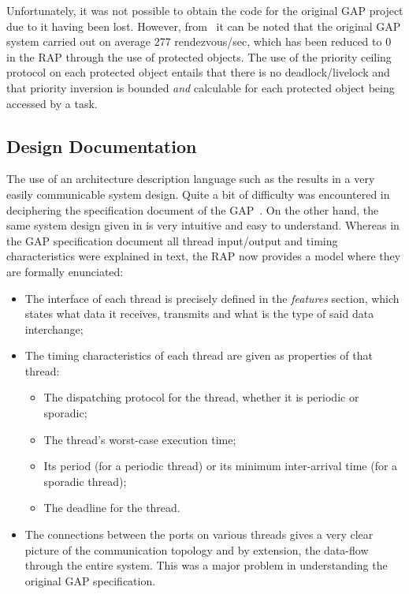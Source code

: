Unfortunately, it was not possible to obtain the code for the original
GAP project due to it having been lost. However,
from~\cite{locke@rtss91, locke@sei90} it can be noted that the
original GAP system carried out on average 277 rendezvous/sec, which
has been reduced to 0 in the RAP through the use of protected
objects. The use of the priority ceiling protocol on each protected
object entails that there is no deadlock/livelock and that priority
inversion is bounded \emph{and} calculable for each protected object
being accessed by a task.

\subsection{Design Documentation}
The use of an architecture description language such as the \aadl
results in a very easily communicable system design. Quite a bit of
difficulty was encountered in deciphering the specification document
of the GAP~\cite{locke@sei90}. On the other hand, the same system
design given in \aadl is very intuitive and easy to
understand. Whereas in the GAP specification document all thread
input/output and timing characteristics were explained in text, the
RAP now provides a model where they are formally enunciated:

\begin{itemize}
\item
  The interface of each thread is precisely defined in the
  \emph{features} section, which states what data it receives,
  transmits and what is the type of said data interchange;

\item
  The timing characteristics of each thread are given as \aadl
  properties of that thread:
  \begin{itemize}
  \item
    The dispatching protocol for the thread, whether it is periodic or
    sporadic;

  \item
    The thread's worst-case execution time;

  \item
    Its period (for a periodic thread) or its minimum inter-arrival
    time (for a sporadic thread);

  \item
    The deadline for the thread.
  \end{itemize}
  
\item
  The connections between the ports on various threads gives a very
  clear picture of the communication topology and by extension, the
  data-flow through the entire system. This was a major problem in
  understanding the original GAP specification.
\end{itemize}

